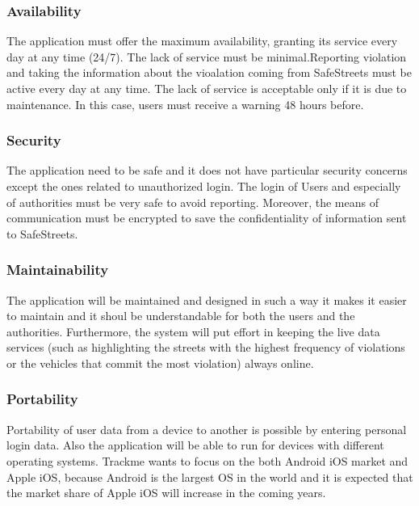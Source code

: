 \subsubsection{Availability}
The application must offer the maximum availability, granting its service every day at any time (24/7). The lack of service must be minimal.Reporting violation and taking the information about the vioalation coming from SafeStreets must be active every day at any time. The lack of service is acceptable only if it is due to maintenance. In this case, users must receive a warning 48 hours before.
\subsubsection{Security}
The application need to be safe and it does not have particular security concerns except the ones related to unauthorized login. The login of Users and especially of authorities must be very safe to avoid reporting. Moreover, the means of communication must be encrypted to save the confidentiality of information sent to SafeStreets.
\subsubsection{Maintainability}
The application will be maintained and designed in such a way it makes it easier to maintain and it shoul be understandable for both the users and the authorities. Furthermore, the system will put eﬀort in keeping the live data services (such as highlighting the streets with the highest frequency of violations or the vehicles that commit the most violation) always online.
\subsubsection{Portability}
Portability of user data from a device to another is possible by entering personal login data. Also the application will be able to run for devices with different operating systems. Trackme wants to focus on the both Android iOS market and Apple iOS, because Android is the largest OS in the world and it is expected that the market share of Apple iOS will increase in the coming years.
